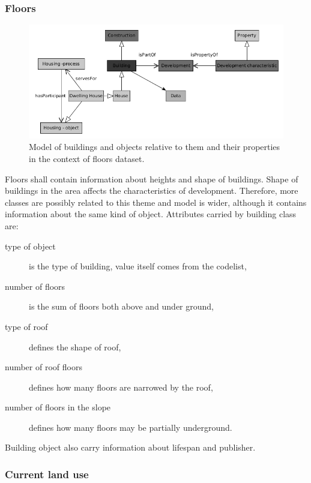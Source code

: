 \documentclass{lncs-template/llncs}
\begin{document}
\subsubsection{Floors}


\begin{figure}
 \includegraphics[width=1.0\textwidth]{images/FLOORS.png}
 \caption{Model of buildings and objects relative to them and their properties in the context of floors dataset.}\label{fig:dat_flo}
\end{figure}

Floors shall contain information about heights and shape of buildings. Shape of buildings in the area affects the characteristics of development. Therefore, more classes are possibly related to this theme and model is wider, although it contains information about the same kind of object. Attributes carried by building class are:
\begin{description}
\item[type of object] is the type of building, value itself comes from the codelist,
\item[number of floors] is the sum of floors both above and under ground,
\item[type of roof] defines the shape of roof,
\item[number of roof floors] defines how many floors are narrowed by the roof,
\item[number of floors in the slope] defines how many floors may be partially underground.
\end{description}
Building object also carry information about lifespan and publisher.

\subsubsection{Current land use}

\end{document}
